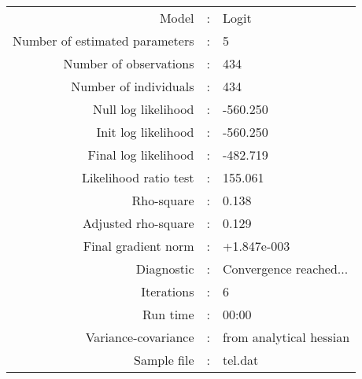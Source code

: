 

\begin{flushleft}
\begin{tabular}{rcl}
\hline
Model &:& Logit\\
Number of estimated parameters&:&5\\
Number of  observations &:& 434\\
Number of individuals&:&434\\
Null log likelihood&:&-560.250\\
Init log likelihood&:&-560.250\\
Final log likelihood&:&-482.719\\
Likelihood ratio test &:&155.061\\
Rho-square&:&0.138\\
Adjusted rho-square&:&0.129\\
Final gradient norm&:&+1.847e-003\\
Diagnostic&:&Convergence reached...\\
Iterations&:&6\\
Run time&:&00:00\\
Variance-covariance&:&from analytical hessian
\\
Sample file&:&tel.dat\\
\end{tabular}
\end{flushleft}
